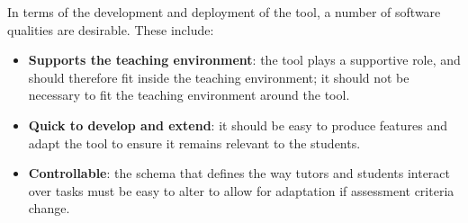 \medskip

In terms of the development and deployment of the tool, a number of software qualities are desirable. These include:
\begin{itemize}[noitemsep,nolistsep]
  \item \textbf{Supports the teaching environment}: the tool plays a supportive role, and should therefore fit inside the teaching environment; it should not be necessary to fit the teaching environment around the tool.
  \item \textbf{Quick to develop and extend}: it should be easy to produce features and adapt the tool to ensure it remains relevant to the students.
  \item \textbf{Controllable}: the schema that defines the way tutors and students interact over tasks must be easy to alter to allow for adaptation if assessment criteria change.
\end{itemize}



